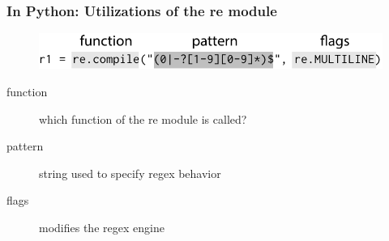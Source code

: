 \begin{frame}
\frametitle{In Python: Utilizations of the re module}
\begin{figure}[h]
  \centering
  \includegraphics[scale=0.77]{../nontex/illustrations/exampleUsageLarge.pdf}
  \label{fig:exampleUsageLarge}
\end{figure}
\begin{description}
\item [function] which function of the re module is called?
\item [pattern] string used to specify regex behavior
\item [flags] modifies the regex engine
\end{description}
\end{frame}







